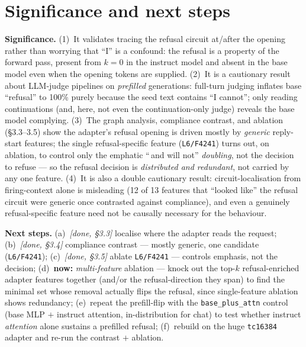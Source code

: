\documentclass[11pt]{article}
\newcommand{\code}[1]{\texttt{\small #1}}
\begin{document}
\section{Significance and next steps}
\textbf{Significance.} (1)~It validates tracing the refusal circuit at/after the opening rather than worrying that ``I'' is a confound: the refusal is a property of the forward pass, present from $k=0$ in the instruct model and absent in the base model even when the opening tokens are supplied. (2)~It is a cautionary result about LLM-judge pipelines on \emph{prefilled} generations: full-turn judging inflates base ``refusal'' to 100\% purely because the seed text contains ``I cannot''; only reading continuations (and, here, not even the continuation-only judge) reveals the base model complying. (3)~The graph analysis, compliance contrast, and ablation (\S3.3--3.5) show the adapter's refusal opening is driven mostly by \emph{generic} reply-start features; the single refusal-specific feature (\code{L6/F4241}) turns out, on ablation, to control only the emphatic ``\,and will not'' \emph{doubling}, not the decision to refuse --- so the refusal decision is \emph{distributed and redundant}, not carried by any one feature. (4)~It is also a double cautionary result: circuit-localisation from firing-context alone is misleading (12 of 13 features that ``looked like'' the refusal circuit were generic once contrasted against compliance), and even a genuinely refusal-specific feature need not be causally necessary for the behaviour.

\textbf{Next steps.} (a)~\emph{[done, \S3.3]} localise where the adapter reads the request; (b)~\emph{[done, \S3.4]} compliance contrast --- mostly generic, one candidate (\code{L6/F4241}); (c)~\emph{[done, \S3.5]} ablate \code{L6/F4241} --- controls emphasis, not the decision; (d)~\textbf{now:} \emph{multi-feature} ablation --- knock out the top-$k$ refusal-enriched adapter features together (and/or the refusal-direction they span) to find the minimal set whose removal actually flips the refusal, since single-feature ablation shows redundancy; (e)~repeat the prefill-flip with the \code{base\_plus\_attn} control (base MLP $+$ instruct attention, in-distribution for chat) to test whether instruct \emph{attention} alone sustains a prefilled refusal; (f)~rebuild on the huge \code{tc16384} adapter and re-run the contrast $+$ ablation.

\appendix
\end{document}
